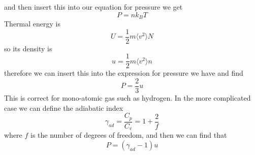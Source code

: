 and then insert this into our equation for pressure we get
\begin{equation}
	P=nk_B T
\end{equation}
Thermal energy is 
\begin{equation}
	U = \frac{1}{2}m\langle v^2 \rangle N
\end{equation}
so its density is
\begin{equation}
	u = \frac{1}{2}m\langle v^2 \rangle n
\end{equation}
therefore we can insert this into the expression for pressure we have and find
\begin{equation}
	P = \frac{2}{3}u
\end{equation}
This is correct for mono-atomic gas such as hydrogen. In the more complicated case we can define the adiabatic index 
\begin{equation}
	\gamma_{ad} = \frac{C_p}{C_v} = 1+\frac{2}{f}
\end{equation}
where \(f\) is the number of degrees of freedom, and then we can find that
\begin{equation}
	P = (\gamma_{ad}-1)u
\end{equation}
